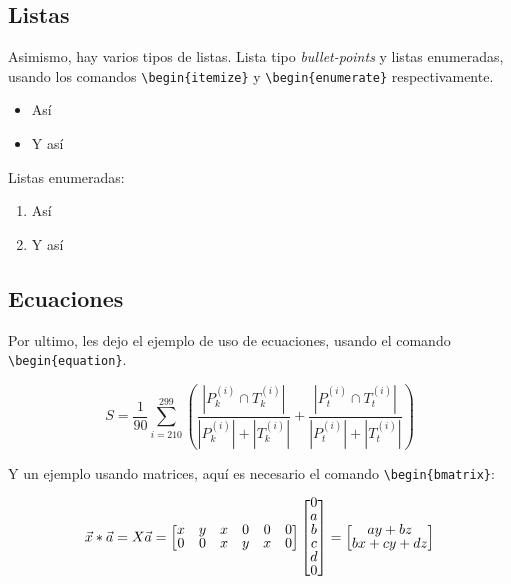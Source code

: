 \documentclass[doc, 12pt, letterpaper, donotrepeattitle, floatsintext, apacite]{apa6}    %
\begin{document}
\subsection{Listas}
Asimismo, hay varios tipos de listas. Lista tipo \textit{bullet-points} y listas enumeradas, usando los comandos \verb|\begin{itemize}| y \verb|\begin{enumerate}| respectivamente.

\begin{itemize}
    \item Así
    \item Y así
\end{itemize}

Listas enumeradas:

\begin{enumerate}
    \item Así
    \item Y así
\end{enumerate}

\subsection{Ecuaciones}
Por ultimo, les dejo el ejemplo de uso de ecuaciones, usando el comando \verb|\begin{equation}|.

\begin{equation}
    S = \frac{1}{90} \sum_{i=210}^{299} \left(\frac{|P^{(i)}_k \cap T^{(i)}_k|}{|P^{(i)}_k| + |T^{(i)}_k|} + \frac{|P^{(i)}_t \cap T^{(i)}_t|}{|P^{(i)}_t| + |T^{(i)}_t|}\right)
    \label{dice}
\end{equation}

Y un ejemplo usando matrices, aquí es necesario el comando \verb|\begin{bmatrix}|:

    \begin{equation}
    \label{eqn:convolution}
    \renewcommand{\arraystretch}{0.8}
    \vec{x}*\vec{a} = X\vec{a} =
        \begin{bmatrix}
           x    &   y   &   x   &   0   &   0   &   0 \\
           0    &   0   &   x   &   y   &   x   &   0 
        \end{bmatrix}
        \begin{bmatrix}
           0\\
           a\\
           b\\
           c\\
           d\\
           0
        \end{bmatrix}
    = 
        \begin{bmatrix}
           ay+bz\\
           bx+cy+dz
        \end{bmatrix}
\end{equation}


\newpage
\renewcommand\refname{\large\textbf{Referencias bibliográficas:}}

\end{document}
